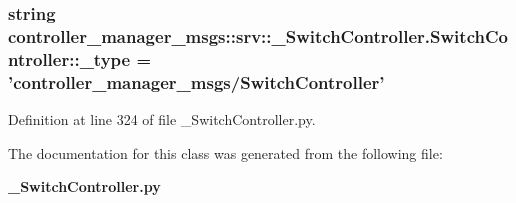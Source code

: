 \subsubsection[{\-\_\-type}]{\setlength{\rightskip}{0pt plus 5cm}string {\bf controller\-\_\-manager\-\_\-msgs\-::srv\-::\-\_\-\-Switch\-Controller.\-Switch\-Controller\-::\-\_\-type} = 'controller\-\_\-manager\-\_\-msgs/{\bf \-Switch\-Controller}'\hspace{0.3cm}{\ttfamily  [static, private]}}\label{classcontroller__manager__msgs_1_1srv_1_1__SwitchController_1_1SwitchController_aaf014bd338693b037caf7a74994fda82}


\-Definition at line 324 of file \-\_\-\-Switch\-Controller.\-py.



\-The documentation for this class was generated from the following file\-:\begin{DoxyCompactItemize}
\item 
{\bf \-\_\-\-Switch\-Controller.\-py}\end{DoxyCompactItemize}
